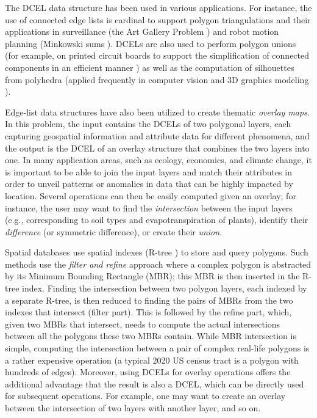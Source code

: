 The DCEL data structure has been used in various applications. For instance, the use of connected edge lists is cardinal to support polygon triangulations and their applications in surveillance (the Art Gallery Problem \cite{chvatal_combinatorial_1975, orourke_art_1987}) and robot motion planning (Minkowski sums \cite{berg_computational_2008, chew_convex_1993}). DCELs are also used to perform polygon unions (for example, on printed circuit boards to support the simplification of connected components in an efficient manner \cite{fogel_cgal_2012}) as well as the computation of silhouettes from polyhedra \cite{fogel_cgal_2012, berberich_arrangements_2010} (applied frequently in computer vision and 3D graphics modeling \cite{boguslawski_modelling_2011}).

Edge-list data structures have also been utilized to create thematic \textit{overlay maps}. In this problem, the input contains the DCELs of two polygonal layers, each capturing geospatial information and attribute data for different phenomena, and the output is the DCEL of an overlay structure that combines the two layers into one. In many application areas, such as ecology, economics, and climate change, it is important to be able to join the input layers and match their attributes in order to unveil patterns or anomalies in data that can be highly impacted by location. Several operations can then be easily computed given an overlay; for instance, the user may want to find the \textit{intersection} between the input layers (e.g., corresponding to soil types and evapotranspiration of plants), identify their \textit{difference} (or symmetric difference), or create their \textit{union}. 

Spatial databases use spatial indexes (R-tree \cite{guttman_r-trees_1984, beckmann_r-tree_1990}) to store and query polygons. Such methods use the 
\textit{filter and refine} approach where a complex polygon is abstracted by its Minimum Bounding Rectangle (MBR); this MBR is then inserted in the R-tree 
index. Finding the intersection between two polygon layers, each indexed by a separate R-tree, is then reduced to finding the pairs of MBRs from the two indexes 
that intersect (filter part). This is followed by the refine part, which, given two MBRs that intersect, needs to compute the actual intersections between all 
the polygons these two MBRs contain. While MBR intersection is simple, computing the intersection between a pair of complex real-life polygons is a rather 
expensive operation (a typical 2020 US census tract is a polygon with hundreds of edges). 
Moreover, using DCELs for overlay operations offers the additional advantage that the result is also a DCEL, which can be directly used for subsequent operations. For example, one may want to create an overlay between the intersection of two layers with another layer, and so on. 

